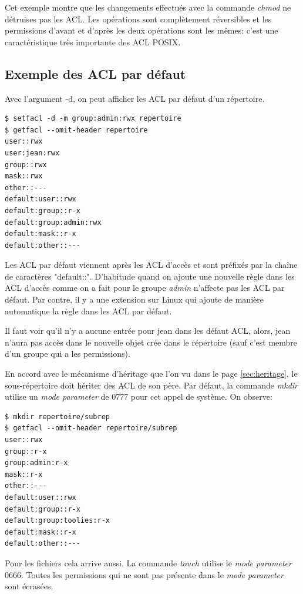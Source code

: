 \documentclass{article}
\begin{document}
Cet exemple montre que les changements effectués avec la commande \emph{chmod} ne détruises pas les ACL. Les opérations sont complètement réversibles et les permissions d'avant et d'après les deux opérations sont les mêmes: c'est une caractéristique très importante des ACL POSIX. 

\subsection{Exemple des ACL par défaut}

Avec l'argument -d, on peut afficher les ACL par défaut d'un répertoire. 

\begin{verbatim}
$ setfacl -d -m group:admin:rwx repertoire 
$ getfacl --omit-header repertoire 
user::rwx
user:jean:rwx
group::rwx 
mask::rwx
other::---
default:user::rwx
default:group::r-x
default:group:admin:rwx
default:mask::r-x
default:other::---
\end{verbatim} 

Les ACL par défaut viennent après les ACL d'accès et sont préfixés par la chaîne de caractères "default::". D'habitude quand on ajoute une nouvelle règle dans les ACL d'accès comme on a fait pour le groupe \emph{admin} n'affecte pas les ACL par défaut. Par contre, il y a une extension sur Linux qui ajoute de manière automatique la règle dans les ACL par défaut. 

Il faut voir qu'il n'y a aucune entrée pour jean dans les défaut ACL, alors, jean n'aura pas accès dans le nouvelle objet crée dans le répertoire (sauf c'est membre d'un groupe qui a les permissions). 

En accord avec le mécanisme d'héritage que l'on vu dans le page \ref{sec:heritage}, le sous-répertoire doit hériter des ACL de son père. Par défaut, la commande \emph{mkdir} utilise un \emph{mode parameter} de 0777 pour cet appel de système. On observe:

\begin{verbatim}
$ mkdir repertoire/subrep 
$ getfacl --omit-header repertoire/subrep 
user::rwx 
group::r-x 
group:admin:r-x 
mask::r-x 
other::--- 
default:user::rwx 
default:group::r-x 
default:group:toolies:r-x 
default:mask::r-x 
default:other::---
\end{verbatim}

Pour les fichiers cela arrive aussi. La commande \emph{touch} utilise le \emph{mode parameter} 0666. Toutes les permissions qui ne sont pas présente dans le \emph{mode parameter} sont écrasées.
\end{document}

